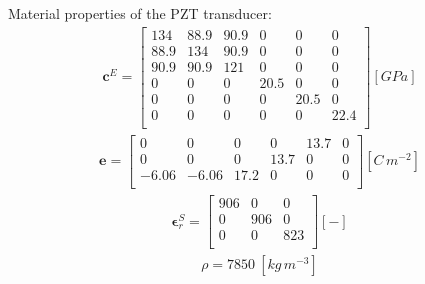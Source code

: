\documentclass[materials,article,submit,moreauthors,pdftex]{Definitions/mdpi}
\begin{document}
{Material properties of the PZT transducer:
\begin{eqnarray}
\textbf{c}^E=\left [ 
\begin{array}{cccccc}
134 & 88.9 & 90.9 & 0 & 0 & 0 \\ 
88.9 & 134 & 90.9 & 0 & 0 & 0 \\
90.9 & 90.9 & 121 & 0 & 0 & 0 \\
0 & 0 & 0 & 20.5 & 0 & 0 \\
0 & 0 & 0 & 0 & 20.5 & 0 \\
0 & 0 & 0 & 0 & 0 & 22.4 \nonumber \\
\end{array}
\right ] \left [ GPa \right ] 
\end{eqnarray}
\begin{eqnarray}
\textbf{e}=\left[
\begin{array}{cccccc}
0 & 0 & 0 & 0 & 13.7 & 0\\
0 & 0 & 0 & 13.7 & 0 & 0\\
-6.06 & -6.06 & 17.2 & 0 & 0 & 0\nonumber \\
\end{array}
\right] \left[C\,m^{-2}\right]
\end{eqnarray}
\begin{eqnarray}
\boldsymbol{\epsilon}^S_r=\left[
\begin{array}{ccc}
906 & 0 & 0\\
0 & 906 & 0\\
0 & 0 & 823\nonumber \\
\end{array}
\right] \left[ - \right]
\end{eqnarray}
\begin{eqnarray}
\rho=7850\ [kg\,m^{-3}] \nonumber
\end{eqnarray}


{}


}
\end{document}
